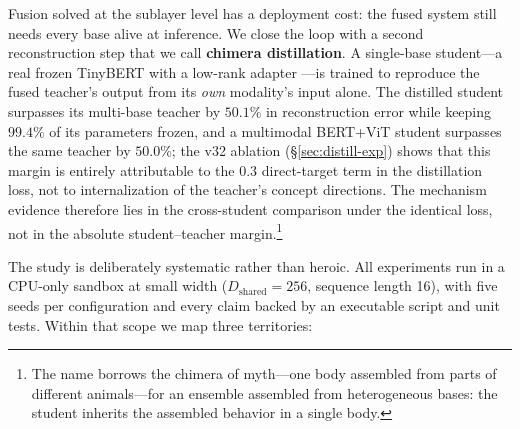 \documentclass[10pt,twoside]{article}
\theoremstyle{definition}
\begin{document}
Fusion solved at the sublayer level has a deployment cost: the fused system still needs every base alive at inference. We close the loop with a second reconstruction step that we call \textbf{chimera distillation}. A single-base student---a real frozen TinyBERT \citep{jiao2020} with a low-rank adapter \citep{hu2022}---is trained to reproduce the fused teacher's output from its \emph{own} modality's input alone. The distilled student surpasses its multi-base teacher by $50.1\%$ in reconstruction error while keeping $99.4\%$ of its parameters frozen, and a multimodal BERT+ViT student surpasses the same teacher by $50.0\%$; the v32 ablation (\S\ref{sec:distill-exp}) shows that this margin is entirely attributable to the $0.3$ direct-target term in the distillation loss, not to internalization of the teacher's concept directions. The mechanism evidence therefore lies in the cross-student comparison under the identical loss, not in the absolute student--teacher margin.\footnote{The name borrows the chimera of myth---one body assembled from parts of different animals---for an ensemble assembled from heterogeneous bases: the student inherits the assembled behavior in a single body.}

The study is deliberately systematic rather than heroic. All experiments run in a CPU-only sandbox at small width ($D_{\text{shared}}{=}256$, sequence length 16), with five seeds per configuration and every claim backed by an executable script and unit tests. Within that scope we map three territories:
\end{document}
